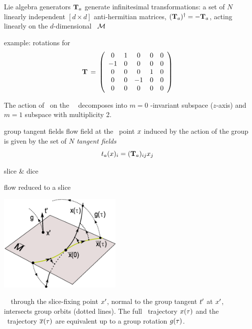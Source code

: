 \documentclass{beamer}
\begin{document}
\begin{frame}{Lie algebra generators}
$\Lg_a$ generate infinitesimal
transformations: a set of $N$ linearly independent
$[d\!\times\!d]$ anti-hermitian matrices, $(\Lg_a)^\dagger =
- \Lg_a$, acting linearly on the $d$-dim\-ens\-ion\-al
\statesp\ $\pS$
\begin{block}{example:  rotations for \cLe}
\[
 \Lg \,=\,   \left(\barr{ccccc}
    0  &  1 & 0  &  0 & 0  \\
   -1  &  0 & 0  &  0 & 0 \\
    0  &  0 & 0  &  1 & 0  \\
    0  &  0 &-1  &  0 & 0 \\
    0  &  0 & 0  &  0 & 0
    \earr\right)
\] %
\end{block}
The action of \
on the \cLe\ \statesp\ decomposes into $m=0$ \Group-invariant
subspace ($z$-axis) and  $m=1$ subspace with multiplicity 2.
\end{frame}

\begin{frame}{group tangent fields}
flow field at the \statesp\
point $\ssp$ induced by the action of the group is given by
the set of $N$ \emph{tangent fields}
\[
\groupTan_a(\ssp)_{i}= (\Lg_a){}_{ij} \ssp_j
\] %
\end{frame}


\begin{frame}{slice \& dice}
\begin{block}{flow reduced to a slice}
\begin{center}
  \includegraphics[width=0.45\textwidth,clip=true]
  {../../Fig/ReducTraj3}
\end{center}
\end{block}
\Slice\ \pSRed\
through the slice-fixing point $\slicep$,
normal to the group tangent $\sliceTan{}$ at $\slicep$,
intersects
group orbits (dotted lines).
The full
\statesp\ trajectory $\ssp(\tau)$ and the \reducedsp\
trajectory $\sspRed(\tau)$ are equivalent up to a group rotation
$\LieEl(\tau)$.
\end{frame}
\end{document}
